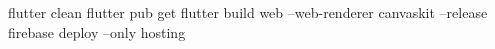 flutter clean
flutter pub get
flutter build web --web-renderer canvaskit --release
firebase deploy --only hosting